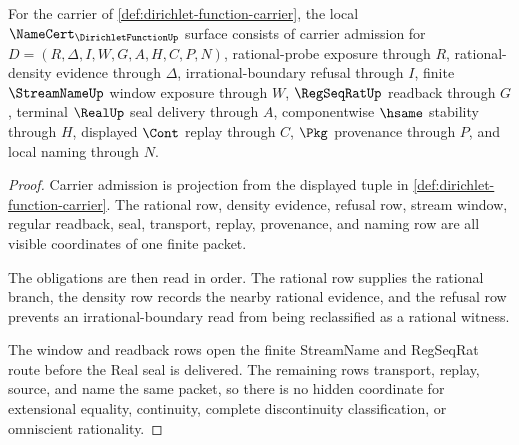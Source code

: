 \begin{theorem}
\label{thm:dirichlet-function-namecert-obligations}
For the carrier of \autoref{def:dirichlet-function-carrier}, the local $\NameCert_{\DirichletFunctionUp}$ surface consists of carrier admission for $D=(R,\Delta,I,W,G,A,H,C,P,N)$, rational-probe exposure through $R$, rational-density evidence through $\Delta$, irrational-boundary refusal through $I$, finite $\StreamNameUp$ window exposure through $W$, $\RegSeqRatUp$ readback through $G$, terminal $\RealUp$ seal delivery through $A$, componentwise $\hsame$ stability through $H$, displayed $\Cont$ replay through $C$, $\Pkg$ provenance through $P$, and local naming through $N$.
\end{theorem}
\begin{proof}
Carrier admission is projection from the displayed tuple in \autoref{def:dirichlet-function-carrier}. The rational row, density evidence, refusal row, stream window, regular readback, seal, transport, replay, provenance, and naming row are all visible coordinates of one finite packet.

The obligations are then read in order. The rational row supplies the rational branch, the density row records the nearby rational evidence, and the refusal row prevents an irrational-boundary read from being reclassified as a rational witness.

The window and readback rows open the finite StreamName and RegSeqRat route before the Real seal is delivered. The remaining rows transport, replay, source, and name the same packet, so there is no hidden coordinate for extensional equality, continuity, complete discontinuity classification, or omniscient rationality.
\end{proof}

